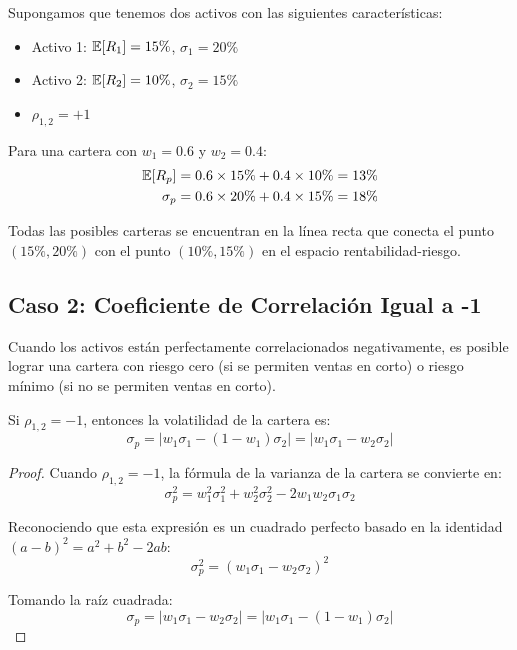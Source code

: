 \begin{ejemplo}
Supongamos que tenemos dos activos con las siguientes características:
\begin{itemize}
\item Activo 1: $\mathbb{E}[R_1] = 15\%$, $\sigma_1 = 20\%$
\item Activo 2: $\mathbb{E}[R_2] = 10\%$, $\sigma_2 = 15\%$
\item $\rho_{1,2} = +1$
\end{itemize}

Para una cartera con $w_1 = 0.6$ y $w_2 = 0.4$:
\begin{align*}
\mathbb{E}[R_p] &= 0.6 \times 15\% + 0.4 \times 10\% = 13\%\\
\sigma_p &= 0.6 \times 20\% + 0.4 \times 15\% = 18\%
\end{align*}

Todas las posibles carteras se encuentran en la línea recta que conecta el punto $(15\%, 20\%)$ con el punto $(10\%, 15\%)$ en el espacio rentabilidad-riesgo.
\end{ejemplo}

\subsection{Caso 2: Coeficiente de Correlación Igual a -1}

Cuando los activos están perfectamente correlacionados negativamente, es posible lograr una cartera con riesgo cero (si se permiten ventas en corto) o riesgo mínimo (si no se permiten ventas en corto).

\begin{teorema}
Si $\rho_{1,2} = -1$, entonces la volatilidad de la cartera es:
\begin{equation}
\sigma_p = |w_1 \sigma_1 - (1 - w_1) \sigma_2| = |w_1 \sigma_1 - w_2 \sigma_2|
\end{equation}
\end{teorema}

\begin{proof}
Cuando $\rho_{1,2} = -1$, la fórmula de la varianza de la cartera se convierte en:
$$\sigma_p^2 = w_1^2 \sigma_1^2 + w_2^2 \sigma_2^2 - 2w_1 w_2 \sigma_1 \sigma_2$$

Reconociendo que esta expresión es un cuadrado perfecto basado en la identidad $(a - b)^2 = a^2 + b^2 - 2ab$:
$$\sigma_p^2 = (w_1 \sigma_1 - w_2 \sigma_2)^2$$

Tomando la raíz cuadrada:
$$\sigma_p = |w_1 \sigma_1 - w_2 \sigma_2| = |w_1 \sigma_1 - (1 - w_1) \sigma_2|$$
\end{proof}

